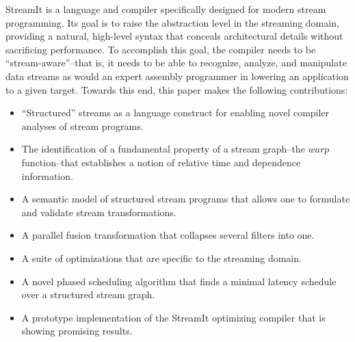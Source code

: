 StreamIt is a language and compiler specifically designed for modern
stream programming.  Its goal is to raise the abstraction level in the
streaming domain, providing a natural, high-level syntax that conceals
architectural details without sacrificing performance.  To accomplish
this goal, the compiler needs to be ``stream-aware''--that is, it
needs to be able to recognize, analyze, and manipulate data streams as
would an expert assembly programmer in lowering an application to a
given target.  Towards this end, this paper makes the following
contributions:
\begin{itemize}

\item ``Structured'' streams as a language construct for enabling
  novel compiler analyses of stream programs.
  
\item The identification of a fundamental property of a stream
  graph--the $warp$ function--that establishes a notion of relative
  time and dependence information.

\item A semantic model of structured stream programs that allows one
  to formulate and validate stream transformations.

\item A parallel fusion transformation that collapses several filters
  into one.

\item A suite of optimizations that are specific to the streaming
  domain.

\item A novel phased scheduling algorithm that finds a minimal latency
schedule over a structured stream graph.

\item A prototype implementation of the StreamIt optimizing compiler
  that is showing promising results.

\end{itemize}

